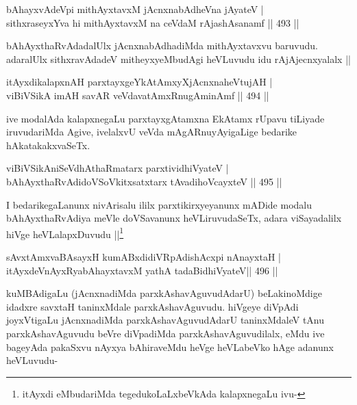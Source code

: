 \begin{shl}
bAhayxvAdeV\s pi mithAyxtavxM jAcnxnabAdheVna jAyateV | \\
sithxraseyxYva hi mithAyxtavxM na ceVdaM rAjashAsanamf \hfill||  493 ||  
\end{shl}

\begin{artha}
bAhAyxthaRvAdadalUlx jAcnxnabAdhadiMda mithAyxtavxvu baruvudu. adaralUlx sithxravAdadeV mitheyxyeMbudAgi heVLuvudu idu rAjAjecnxyalalx ||
\end{artha}


\begin{shl}
itAyxdikalapxnAH parxtayxgeYkAtAmxyXjAcnxnaheVtujAH | \\
viBiVSikA imAH savAR veVdavatAmxRnugAminAmf \hfill||  494 ||  
\end{shl}

\begin{artha}
ive modalAda kalapxnegaLu parxtayxgAtamxna EkAtamx rUpavu tiLiyade iruvudariMda Agive, ivelalxvU veVda mAgARnuyAyigaLige bedarike hAkatakakxvaSeTx.
\end{artha}

\begin{shl}
viBiVSikAniSeVdhAthaRmatarx parxtividhiVyateV | \\
bAhAyxthaRvAdidoVSoVkitxsatxtarx tAvadihoVcayxteV \hfill||  495 ||  
\end{shl}

\begin{artha}
I bedarikegaLanunx nivArisalu ililx parxtikirxyeyanunx mADide modalu bAhAyxthaRvAdiya meVle doVSavanunx heVLiruvudaSeTx, adara viSayadalilx hiVge heVLalapxDuvudu ||\footnote{itAyxdi eMbudariMda tegedukoLaLxbeVkAda kalapxnegaLu ivu-}
\end{artha}

\begin{shl}
sAvxtAmxvaBAsayxH kumABxdidiVRpAdishAcxpi nAnayxtaH | \\
itAyxdeVnAyxRyabAhayxtavxM yathA tadaBidhiVyateV\hfill ||  496 ||  
\end{shl}

\begin{artha}
kuMBAdigaLu (jAcnxnadiMda parxkAshavAguvudAdarU) beLakinoMdige idadxre savxtaH taninxMdale parxkAshavAguvudu. hiVgeye diVpAdi joyxVtigaLu jAcnxnadiMda parxkAshavAguvudAdarU taninxMdaleV tAnu parxkAshavAguvudu beVre diVpadiMda parxkAshavAguvudilalx, eMdu ive bageyAda pakaSxvu nAyxya bAhiraveMdu heVge heVLabeVko hAge adanunx heVLuvudu-
\end{artha}

